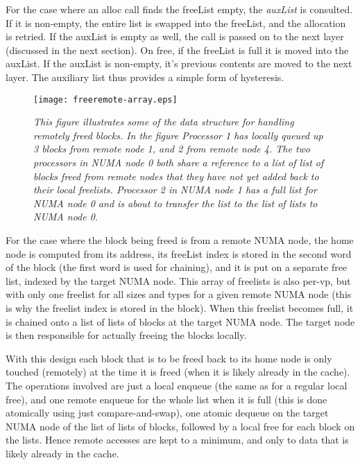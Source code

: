 \documentclass[dvips,11pt]{article}
\begin{document}
For the case where an alloc call finds the freeList empty, the
\emph{auxList} is consulted.  If it is non-empty, the entire list is
swapped into the freeList, and the allocation is retried.  If the auxList
is empty as well, the call is passed on to the next layer (discussed in the
next section).  On free, if the freeList is full it is moved into the
auxList.  If the auxList is non-empty, it's previous contents are moved to
the next layer.  The auxiliary list thus provides a simple form of
hysteresis.


\begin{figure}[t]
  \centerline{
    \texttt{[image: freeremote-array.eps]}
    }
  \caption{\small\emph{This figure illustrates some of the data structure
      for handling remotely freed blocks.  In the figure Processor 1 has
      locally queued up 3 blocks from remote node 1, and 2 from remote node
      4.  The two processors in NUMA node 0 both share a reference to a
      list of list of blocks freed from remote nodes that they have not yet
      added back to their local freelists.  Processor 2 in NUMA node 1 has
      a full list for NUMA node 0 and is about to transfer the list to the
      list of lists to NUMA node 0.}}
  \label{freeremote-array:fig}
\end{figure}

For the case where the block being freed is from a remote NUMA node, the
home node is computed from its address, its freeList index is stored in the
second word of the block (the first word is used for chaining), and it is
put on a separate free list, indexed by the target NUMA node.  This array
of freelists is also per-vp, but with only one freelist for all sizes and
types for a given remote NUMA node (this is why the freelist index is
stored in the block).  When this freelist becomes full, it is chained onto
a list of lists of blocks at the target NUMA node.  The target node is then
responsible for actually freeing the blocks locally.

With this design each block that is to be freed back to its home node is
only touched (remotely) at the time it is freed (when it is likely already
in the cache).  The operations involved are just a local enqueue (the same
as for a regular local free), and one remote enqueue for the whole list
when it is full (this is done atomically using just compare-and-swap), one
atomic dequeue on the target NUMA node of the list of lists of blocks,
followed by a local free for each block on the lists.  Hence remote
accesses are kept to a minimum, and only to data that is likely already in
the cache.
\end{document}
